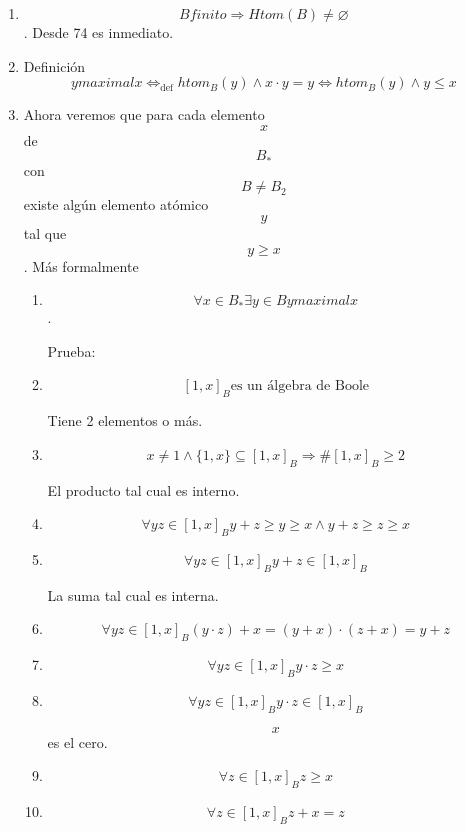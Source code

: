 \begin{enumerate}
\begin{enumerate}
\begin{enumerate}
\begin{enumerate}
      \end{enumerate}
    \item
      \[B\mathit{finito}\Rightarrow\mathit{Htom}{{(B)} \neq \varnothing}\].
      Desde 74 es inmediato.
    \item
      Definición
      \[y\mathsf{\mathit{maximal}}x\Leftrightarrow_{\text{def}}\mathsf{\mathit{htom}}_{B}{{{{(y)} \land x} \cdot y} = y}\Leftrightarrow\mathsf{\mathit{htom}}_{B}{{{(y)} \land y} \leq x}\]
    \item
      Ahora veremos que para cada elemento \[x\] de \[B_{\ast}\] con
      \[B \neq B_{2}\] existe algún elemento atómico \[y\] tal que
      \[y \geq x\]. Más formalmente

      \begin{enumerate}
      \def\labelenumiv{\arabic{enumiv}.}
      \item
        \[\forall{x \in B_{\ast}}\exists{y \in B}y\mathsf{\mathit{maximal}}x\].

        Prueba:
      \item
        \[\left\lbrack {1,x} \right\rbrack_{B}\text{es un álgebra de Boole}\]

        Tiene 2 elementos o más.
      \item
        \[{{x \neq {1 \land {\{{1,x}\}}}} \subseteq \left\lbrack {1,x} \right\rbrack_{B}}\Rightarrow\#{\left\lbrack {1,x} \right\rbrack_{B} \geq 2}\]

        El producto tal cual es interno.
      \item
        \[\forall{\mathit{yz} \in \left\lbrack {1,x} \right\rbrack_{B}}{{{{{y + z} \geq y} \geq {{x \land y} + z}} \geq z} \geq x}\]
      \item
        \[\forall{\mathit{yz} \in \left\lbrack {1,x} \right\rbrack_{B}}{{y + z} \in \left\lbrack {1,x} \right\rbrack_{B}}\]

        La suma tal cual es interna.
      \item
        \[\forall{\mathit{yz} \in \left\lbrack {1,x} \right\rbrack_{B}}{{{{({y \cdot z})} + x} = {{({y + x})} \cdot {({z + x})}}} = {y + z}}\]
      \item
        \[\forall{\mathit{yz} \in \left\lbrack {1,x} \right\rbrack_{B}}{{y \cdot z} \geq x}\]
      \item
        \[\forall{\mathit{yz} \in \left\lbrack {1,x} \right\rbrack_{B}}{{y \cdot z} \in \left\lbrack {1,x} \right\rbrack_{B}}\]

        \[x\]es el cero.
      \item
        \[\forall{z \in \left\lbrack {1,x} \right\rbrack_{B}}{z \geq x}\]
      \item
        \[\forall{z \in \left\lbrack {1,x} \right\rbrack_{B}}{{z + x} = z}\]


\end{enumerate}
\end{enumerate}
\end{enumerate}
\end{enumerate}
